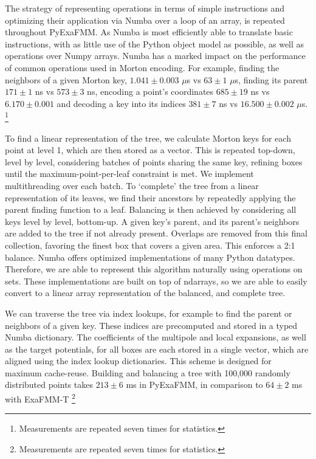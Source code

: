\documentclass{IEEEcsmag}
\begin{document}
The strategy of representing operations in terms of simple instructions and optimizing their application via Numba over a loop of an array, is repeated throughout PyExaFMM. As Numba is most efficiently able to translate basic instructions, with as little use of the Python object model as possible, as well as operations over Numpy arrays. Numba has a marked impact on the performance of common operations used in Morton encoding. For example, finding the neighbors of a given Morton key, $1.041 \pm 0.003$ $\mu$s vs  $63 \pm 1$ $\mu$s, finding its parent $171 \pm 1$ ns vs $573 \pm 3$ ns, encoding a point's coordinates $685 \pm 19$ ns vs $6.170 \pm 0.001$ and decoding a key into its indices $381 \pm 7$ ns vs $16.500 \pm 0.002$ $\mu$s. \footnote[3]{Measurements are repeated seven times for statistics.}

To find a linear representation of the tree, we calculate Morton keys for each point at level 1, which are then stored as a vector. This is repeated top-down, level by level, considering batches of points sharing the same key, refining boxes until the maximum-point-per-leaf constraint is met. We implement multithreading over each batch. To `complete' the tree from a linear representation of its leaves, we find their ancestors by repeatedly applying the parent finding function to a leaf. Balancing is then achieved by considering all keys level by level, bottom-up. A given key's parent, and its parent's neighbors are added to the tree if not already present. Overlaps are removed from this final collection, favoring the finest box that covers a given area. This enforces a 2:1 balance. Numba offers optimized implementations of many Python datatypes. Therefore, we are able to represent this algorithm naturally using operations on sets. These implementations are built on top of ndarrays, so we are able to easily convert to a linear array representation of the balanced, and complete tree.

We can traverse the tree via index lookups, for example to find the parent or neighbors of a given key. These indices are precomputed and stored in a typed Numba dictionary. The coefficients of the multipole and local expansions, as well as the target potentials, for all boxes are each stored in a single vector, which are aligned using the index lookup dictionaries. This scheme is designed for maximum cache-reuse.
Building and balancing a tree with 100,000 randomly distributed points takes $213 \pm 6$ ms in PyExaFMM, in comparison to $64 \pm 2$ ms with ExaFMM-T \footnote[4]{Measurements are repeated seven times for statistics.}
\end{document}
